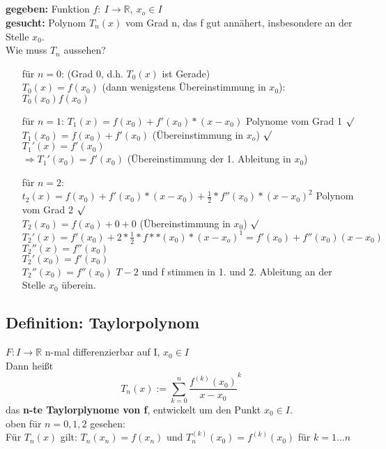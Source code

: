 \subsection*{}
\textbf{gegeben:} Funktion $f: \ I\rightarrow \mathbb{R}, \ x_o\in I$\\
\textbf{gesucht:} Polynom $T_n(x)$ vom Grad n, das f gut annähert, insbesondere an der Stelle $x_0$.\\
Wie muss $T_n$ aussehen?
\begin{enumerate}
	\item[für $n=0$:]
	(Grad 0, d.h. $T_0(x)$ ist Gerade)\\
	$T_0(x)=f(x_0)$ (dann wenigstens Übereinstimmung in $x_0$):\\
	$T_0(x_0)f(x_0)$
	
	\item[für $n=1$:]
	$T_1(x)=f(x_0)+f'(x_0)*(x-x_0)$ Polynome vom Grad 1 $\surd$\\
	$T_1(x_0)=f(x_0)+f'(x_0)$ (Übereinstimmung in $x_o$) $\surd$\\
	$T_1'(x)=f'(x_0)$\\
	$\Rightarrow T_1'(x_0)=f'(x_0)$ (Übereinstimmung der 1. Ableitung in $x_0$)
	
	\item[für $n=2$:]
	$t_2(x)=f(x_0)+f'(x_0)*(x-x_0)+\frac{1}{2}*f''(x_0)*(x-x_0)^2$ Polynom vom Grad 2 $\surd$\\
	$T_2(x_0)=f(x_0)+0+0$ (Übereinstimmung in $x_0$) $\surd$\\
	$T_2'(x)=f'(x_0)+2*\frac{1}{2}*f**(x_0)*(x-x_o)^1=f'(x_0)+f''(x_0)(x-x_0)$\\
	$T_2''(x)=f''(x_0)$\\
	$T_2'(x_0)=f'(x_0)$\\
	$T_2''(x_0)=f''(x_0)$ $T-2$ und f stimmen in 1. und 2. Ableitung an der Stelle $x_0$ überein.
\end{enumerate}

\subsection{Definition: Taylorpolynom}
$F:I\rightarrow \mathbb{R}$ n-mal differenzierbar auf I, $x_0\in I$\\
Dann heißt \[T_n(x):=\sum_{k=0}^n \frac{f^{(k)}(x_0)}{x-x_0}^k\] das \textbf{n-te Taylorplynome von f}, entwickelt um den Punkt $x_0\in I$.\\
oben für $n=0,1,2$ gesehen:\\
Für $T_n(x)$ gilt: $T_n(x_n)=f(x_n)$ und $T_n^{(k)}(x_0)=f^{(k)}(x_0)$ für $k=1\dots n$


